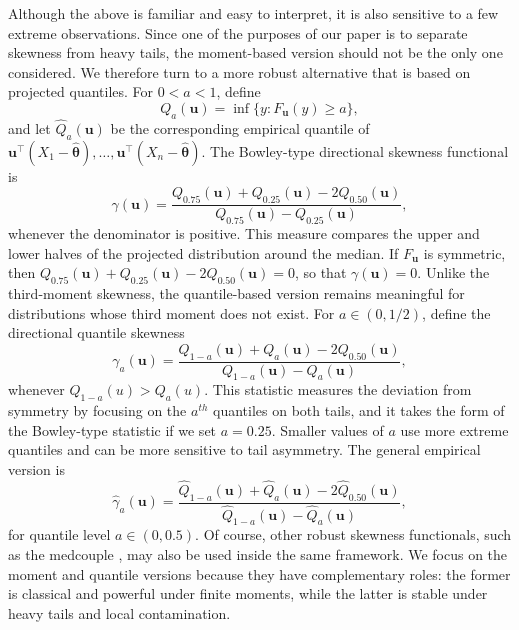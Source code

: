 \documentclass[11pt]{article}
\theoremstyle{plain}
\theoremstyle{definition}
\theoremstyle{remark}
\def\u{\bm{u}}
\newcommand{\boldtheta}{\bm{\theta}}
\newcommand{\sd}[1]{{\color{red}(SD: #1)}}
\begin{document}
Although the above is familiar and easy to interpret, it is also sensitive to a few extreme observations. Since one of the purposes of our paper is to separate skewness from heavy tails, the moment-based version should not be the only one considered. We therefore turn to a more robust alternative that is based on projected quantiles. For \(0<a<1\), define
\[
Q_a(\u)=\inf\{y:F_{\u}(y) \geqslant a\},
\]
and let \(\widehat Q_a(\u)\) be the corresponding empirical quantile of $\u^\top(X_1-\widehat{\boldtheta}),\ldots,\u^\top(X_n-\widehat{\boldtheta})$. The Bowley-type directional skewness functional is
\[
\gamma(\u)
=
\frac{
	Q_{0.75}(\u)+Q_{0.25}(\u)-2Q_{0.50}(\u)
}{
	Q_{0.75}(\u)-Q_{0.25}(\u)
},
\]
whenever the denominator is positive. This measure compares the upper and lower halves of the projected distribution around the median. If \(F_{\u}\) is symmetric, then $Q_{0.75}(\u)+Q_{0.25}(\u)-2Q_{0.50}(\u)=0$, so that \(\gamma(\u)=0\). Unlike the third-moment skewness, the quantile-based version remains meaningful for distributions whose third moment does not exist. For \(a\in (0,1/2)\), define the directional quantile skewness
\[
\gamma_{a}(\u)
=
\frac{Q_{1-a}(\u)+Q_a(\u)-2Q_{0.50}(\u)}
     {Q_{1-a}(\u)-Q_a(\u)},
\]
whenever \(Q_{1-a}(u)>Q_a(u)\). This statistic measures the deviation from symmetry by focusing on the $a^{th}$ quantiles on both tails, and it takes the form of the Bowley-type statistic if we set $a=0.25$. Smaller values of \(a\) use more extreme quantiles and can be more sensitive to tail asymmetry. The general empirical version is
\begin{equation}
\label{eq:quantile_based_skewness_statistic}
    \widehat\gamma_{a}(\u) = \frac{\widehat Q_{1-a}(\u)+\widehat Q_{a}(\u)-2\widehat Q_{0.50}(\u)}
    {\widehat Q_{1-a}(\u)-\widehat Q_{a}(\u)},
\end{equation}
for quantile level $a \in (0,0.5)$.  Of course, other robust skewness functionals, such as the medcouple \citep{brys2004robust}, may also be used inside the same framework. We focus on the moment and quantile versions because they have complementary roles: the former is classical and powerful under finite moments, while the latter is stable under heavy tails and local contamination.

\end{document}

